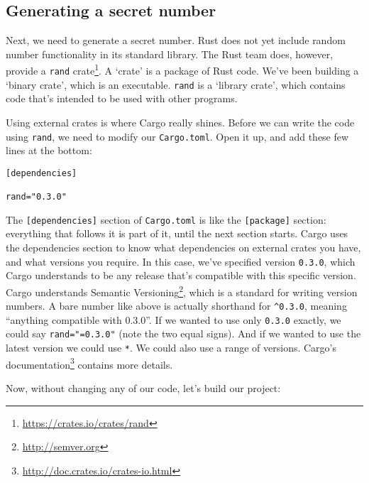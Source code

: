 \documentclass[a4paper,]{book}
\newenvironment{Shaded}{\begin{snugshade}}{\end{snugshade}}
\newcommand{\KeywordTok}[1]{\textcolor[rgb]{0.13,0.29,0.53}{\textbf{{#1}}}}
\newcommand{\NormalTok}[1]{{#1}}
\renewcommand{\href}[2]{#2\footnote{\url{#1}}}
\begin{document}
\subsection{Generating a secret
number}\label{generating-a-secret-number}

Next, we need to generate a secret number. Rust does not yet include
random number functionality in its standard library. The Rust team does,
however, provide a \href{https://crates.io/crates/rand}{\texttt{rand}
crate}. A `crate' is a package of Rust code. We've been building a
`binary crate', which is an executable. \texttt{rand} is a `library
crate', which contains code that's intended to be used with other
programs.

Using external crates is where Cargo really shines. Before we can write
the code using \texttt{rand}, we need to modify our \texttt{Cargo.toml}.
Open it up, and add these few lines at the bottom:

\begin{verbatim}
[dependencies]

rand="0.3.0"
\end{verbatim}

The \texttt{{[}dependencies{]}} section of \texttt{Cargo.toml} is like
the \texttt{{[}package{]}} section: everything that follows it is part
of it, until the next section starts. Cargo uses the dependencies
section to know what dependencies on external crates you have, and what
versions you require. In this case, we've specified version
\texttt{0.3.0}, which Cargo understands to be any release that's
compatible with this specific version. Cargo understands
\href{http://semver.org}{Semantic Versioning}, which is a standard for
writing version numbers. A bare number like above is actually shorthand
for \texttt{\^{}0.3.0}, meaning ``anything compatible with 0.3.0''. If
we wanted to use only \texttt{0.3.0} exactly, we could say
\texttt{rand="=0.3.0"} (note the two equal signs). And if we wanted to
use the latest version we could use \texttt{*}. We could also use a
range of versions. \href{http://doc.crates.io/crates-io.html}{Cargo's
documentation} contains more details.

Now, without changing any of our code, let's build our project:

\begin{Shaded}
\end{Shaded}
\end{document}
